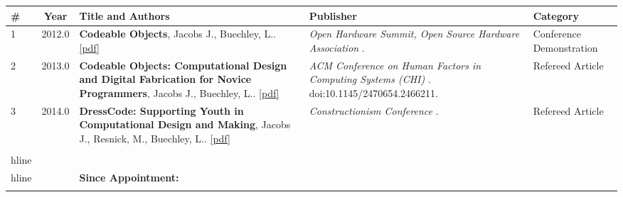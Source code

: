 
\begin{longtable}{lcp{7.75cm}>{\raggedright}p{5.25cm}p{1.75cm}}
\# & Year & Title and Authors & Publisher & Category\\
\hline 
\endhead 
    1 & 2012.0 & {\bf Codeable Objects}, Jacobs J., Buechley, L.. \href{nan}{[pdf]} & \emph{ Open Hardware Summit, Open Source Hardware Association } .   & Conference Demonstration\\
    2 & 2013.0 & {\bf Codeable Objects: Computational Design and Digital Fabrication for Novice Programmers}, Jacobs J., Buechley, L.. \href{nan}{[pdf]} & \emph{ ACM Conference on Human Factors in Computing Systems (CHI) } . doi:10.1145/2470654.2466211.  & Refereed Article\\
    3 & 2014.0 & {\bf DressCode: Supporting Youth in Computational Design and Making}, Jacobs J., Resnick, M., Buechley, L.. \href{nan}{[pdf]} & \emph{ Constructionism Conference  } .   & Refereed Article\\
\\hline
\\hline
   &   & {\bf Since Appointment:} &    &   \\\\
\end{longtable}
